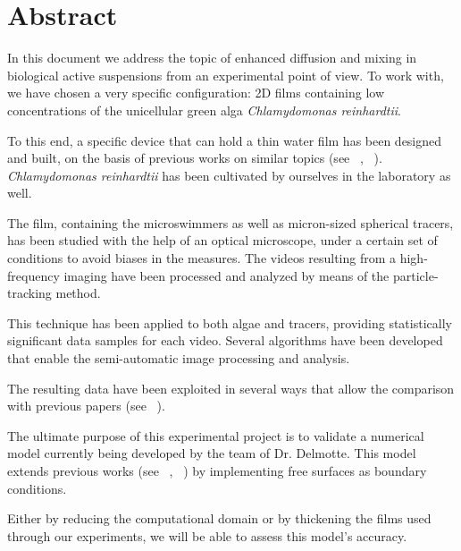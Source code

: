 \chapter*{Abstract}

In this document we address the topic of enhanced diffusion and mixing in biological active suspensions from an experimental point of view. To work with, we have chosen a very specific configuration: 2D films containing low concentrations of the unicellular green alga \textit{Chlamydomonas reinhardtii}.

To this end, a specific device that can hold a thin water film has been designed and built, on the basis of previous works on similar topics (see ~\cite{Sokolov2007}, ~\cite{Guasto}). \textit{Chlamydomonas reinhardtii} has been cultivated by ourselves in the laboratory as well.

The film, containing the microswimmers as well as micron-sized spherical tracers, has been studied with the help of an optical microscope, under a certain set of conditions to avoid biases in the measures. The videos resulting from a high-frequency imaging have been processed and analyzed by means of the particle-tracking method. 

This technique has been applied to both algae and tracers, providing statistically significant data samples for each video. Several algorithms have been developed that enable the semi-automatic image processing and analysis.

The resulting data have been exploited in several ways that allow the comparison with previous papers (see ~\cite{Kurtuldu2011}). 

The ultimate purpose of this experimental project is to validate a numerical model currently being developed by the team of Dr. Delmotte. This model extends previous works (see ~\cite{Delmotte2015}, ~\cite{Delmotte2018}) by implementing free surfaces as boundary conditions.

Either by reducing the computational domain or by thickening the films used through our experiments, we will be able to assess this model's accuracy.
